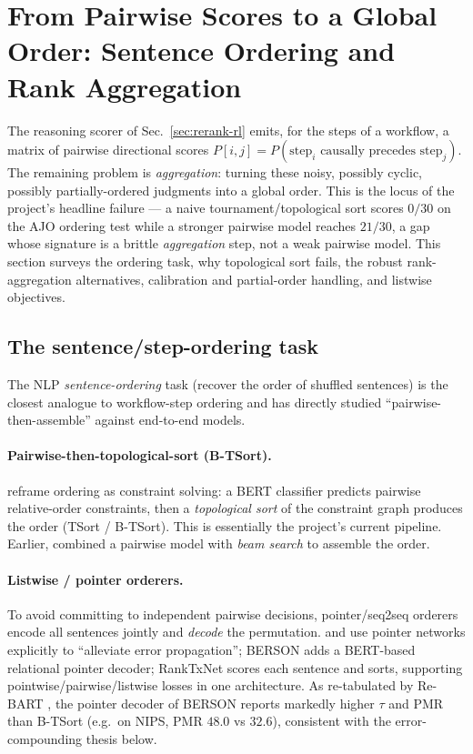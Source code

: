 \section{From Pairwise Scores to a Global Order: Sentence Ordering and Rank Aggregation}
\label{sec:ordering}

The reasoning scorer of Sec.~\ref{sec:rerank-rl} emits, for the steps of a
workflow, a matrix of pairwise directional scores
$P[i,j] = P(\text{step}_i \text{ causally precedes } \text{step}_j)$. The
remaining problem is \emph{aggregation}: turning these noisy, possibly cyclic,
possibly partially-ordered judgments into a global order. This is the locus of
the project's headline failure --- a naive tournament/topological sort scores
$0/30$ on the AJO ordering test while a stronger pairwise model reaches $21/30$,
a gap whose signature is a brittle \emph{aggregation} step, not a weak pairwise
model. This section surveys the ordering task, why topological sort fails, the
robust rank-aggregation alternatives, calibration and partial-order handling, and
listwise objectives.

\subsection{The sentence/step-ordering task}
\label{sec:ordering-task}
The NLP \emph{sentence-ordering} task (recover the order of shuffled sentences) is
the closest analogue to workflow-step ordering and has directly studied
``pairwise-then-assemble'' against end-to-end models.

\paragraph{Pairwise-then-topological-sort (B-TSort).}
\citet{ord:prabhumoye2020btsort} reframe ordering as constraint solving: a BERT
classifier predicts pairwise relative-order constraints, then a \emph{topological
sort} of the constraint graph produces the order (TSort / B-TSort). This is
essentially the project's current pipeline. Earlier, \citet{ord:chen2016neural}
combined a pairwise model with \emph{beam search} to assemble the order.

\paragraph{Listwise / pointer orderers.} To avoid committing to independent
pairwise decisions, pointer/seq2seq orderers encode all sentences jointly and
\emph{decode} the permutation. \citet{ord:gong2016pointer} and
\citet{ord:logeswaran2018sentence} use pointer networks explicitly to
``alleviate error propagation''; BERSON \citep{ord:cui2020berson} adds a
BERT-based relational pointer decoder; RankTxNet \citep{ord:kumar2020ranktxnet}
scores each sentence and sorts, supporting pointwise/pairwise/listwise losses in
one architecture. As re-tabulated by Re-BART \citep{ord:rebart2021}, the pointer
decoder of BERSON reports markedly higher $\tau$ and PMR than B-TSort (e.g.\ on
NIPS, PMR $48.0$ vs $32.6$), consistent with the error-compounding thesis below.

